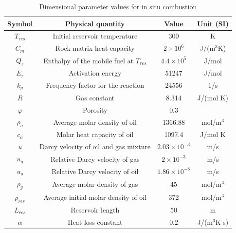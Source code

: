 \begin{table}[ht!]
	\caption{Dimensional parameter values for in situ combustion}
	\label{Tabla1}
	\centering
	\begin{tabular}{c c c c}
		\hline
		Symbol       & Physical quantity                        & Value                 & Unit (SI)    \\ \hline
		$T_{res}$    & Initial reservoir temperature            & 300                   & K            \\
		$C_m$        & Rock matrix heat capacity                & $2 \times 10^6$       & J/(m$^3$K)   \\
		$Q_r$        & Enthalpy of the mobile fuel at $T_{res}$ & $4.4\times 10^5$      & J/mol        \\
		$E_r$        & Activation energy                        & 51247                 & J/mol        \\
		$k_p$        & Frequency factor for the reaction        & $24556$               & 1/s          \\
		$R$          & Gas constant                             & 8.314                 & J/(mol K)    \\
		$\varphi$    & Porosity                                 & 0.3                   &              \\
		$\rho_o$     & Average molar density of oil             & 1366.88               & mol/m$^3$    \\
		$c_o$        & Molar heat capacity of oil               & 1097.4                & J/mol K      \\
		$u$          & Darcy velocity of oil and gas mixture    & $2.03 \times 10^{-3}$ & m/s          \\
		$u_g$        & Relative Darcy velocity of gas           & $2 \times 10^{-3}$    & m/s          \\
		$u_o$        & Relative Darcy velocity of oil           & $1.86 \times 10^{-8}$ & m/s          \\
		$\rho_{g}$   & Average molar density of gas             & 45                    & mol/m$^3$    \\
		$\rho_{res}$ & Average initial molar density of oil     & 372                   & mol/m$^3$    \\
		$L_{res}$    & Reservoir length                         & $50$                  & m            \\
		$\alpha$     & Heat loss constant                       & $0.2$                 & J/(m$^3$K s) \\
		\hline
	\end{tabular}
\end{table}

